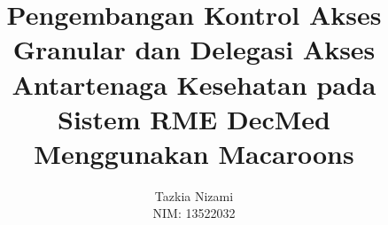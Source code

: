 \documentclass[bahasa, 12pt, a4paper, onecolumn, oneside, final]{report}
\begin{document}
\title{Pengembangan Kontrol Akses Granular dan Delegasi Akses Antartenaga Kesehatan pada Sistem RME DecMed Menggunakan Macaroons}
\date{}
\author{
	Tazkia Nizami \\
	NIM: 13522032
}
\newcommand\tanggalpengesahan{19 Juli 2026}




% 

\pagestyle{plain}


\begingroup
\renewcommand{\thetitle}{Granular Access Control and Access Delegation Among Healthcare Professionals in the DecMed EMR System Using Macaroons}

\endgroup
\end{document}
